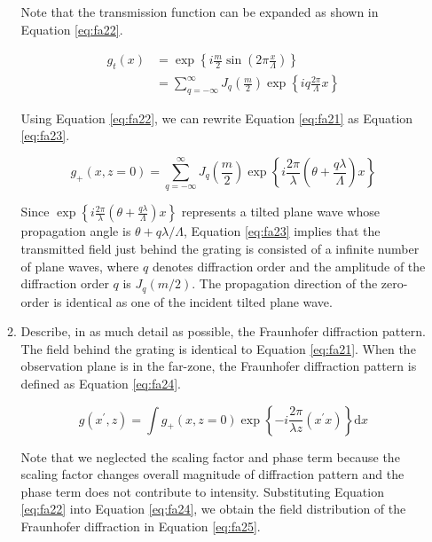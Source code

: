 \documentclass[main.tex]{subfiles}
\begin{document}
\begin{enumerate}
\begin{enumerate}
Note that the transmission function can be expanded as shown in Equation \ref{eq:fa22}.

\begin{equation}\label{eq:fa22}
\begin{aligned} 
g_{t}(x)&=\exp \left\{i \frac{m}{2} \sin \left(2 \pi \frac{x}{\Lambda}\right)\right\}\\
&=\sum_{q=-\infty}^{\infty} J_{q}\left(\frac{m}{2}\right) \exp \left\{i q \frac{2 \pi}{\Lambda} x\right\}
\end{aligned} 
\end{equation}

Using Equation \ref{eq:fa22}, we can rewrite Equation \ref{eq:fa21} as Equation \ref{eq:fa23}.

\begin{equation}\label{eq:fa23}
g_{+}(x, z=0)=\sum_{q=-\infty}^{\infty} J_{q}\left(\frac{m}{2}\right) \exp \left\{i \frac{2 \pi}{\lambda}\left(\theta+\frac{q \lambda}{\Lambda}\right) x\right\}
\end{equation}

Since $\exp \left\{i \frac{2 \pi}{\lambda}\left(\theta+\frac{q \lambda}{\Lambda}\right) x\right\}$ represents a tilted plane wave whose propagation angle is $\theta + q\lambda / \Lambda$, Equation \ref{eq:fa23} implies that the transmitted field just behind the grating is consisted of a infinite number of plane waves, where $q$ denotes diffraction order and the amplitude of the diffraction order $q$ is $J_q(m/2)$. The propagation direction of the zero-order is identical as one of the incident tilted plane wave.\\

\item{Describe, in as much detail as possible, the Fraunhofer diffraction pattern.}\\

The field behind the grating is identical to Equation \ref{eq:fa21}. When the observation plane is in the far-zone, the Fraunhofer diffraction pattern is defined as Equation \ref{eq:fa24}.

\begin{equation}\label{eq:fa24}
g\left(x^{\prime}, z\right)=\int g_{+}(x, z=0) \exp \left\{-i \frac{2 \pi}{\lambda z}\left(x^{\prime} x\right)\right\} \mathrm{d} x
\end{equation}

Note that we neglected the scaling factor and phase term because the scaling factor changes overall magnitude of diffraction pattern and the phase term does not contribute to intensity. Substituting Equation \ref{eq:fa22} into Equation \ref{eq:fa24}, we obtain the field distribution of the Fraunhofer diffraction in Equation \ref{eq:fa25}.


\end{enumerate}
\end{enumerate}
\end{document}

